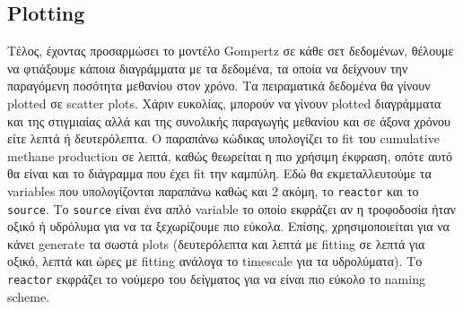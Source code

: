 \documentclass[11pt]{article}
\begin{document}
\subsection{Plotting}
\label{sec:org53a2cf7}
Τέλος, έχοντας προσαρμώσει το μοντέλο Gompertz σε κάθε σετ δεδομένων, θέλουμε να φτιάξουμε κάποια διαγράμματα με τα δεδομένα, τα οποία να δείχνουν την παραγόμενη ποσότητα μεθανίου στον χρόνο. Τα πειραματικά δεδομένα θα γίνουν plotted σε scatter plots. Χάριν ευκολίας, μπορούν να γίνουν plotted διαγράμματα και της στιγμιαίας αλλά και της συνολικής παραγωγής μεθανίου και σε άξονα χρόνου είτε λεπτά ή δευτερόλεπτα. Ο παραπάνω κώδικας υπολογίζει το fit του cumulative methane production σε λεπτά, καθώς θεωρείται η πιο χρήσιμη έκφραση, οπότε αυτό θα είναι και το διάγραμμα που έχει fit την καμπύλη. Εδώ θα εκμεταλλευτούμε τα variables που υπολογίζονται παραπάνω καθώς και 2 ακόμη, το \texttt{reactor} και το \texttt{source}. Το \texttt{source} είναι ένα απλό variable το οποίο εκφράζει αν η τροφοδοσία ήταν οξικό ή υδρόλυμα για να τα ξεχωρίζουμε πιο εύκολα. Επίσης, χρησιμοποιείται για να κάνει generate τα σωστά plots (δευτερόλεπτα και λεπτά με fitting σε λεπτά για οξικό, λεπτά και ώρες με fitting ανάλογα το timescale για τα υδρολύματα). Το \texttt{reactor} εκφράζει το νούμερο του δείγματος για να είναι πιο εύκολο το naming scheme.
\end{document}
